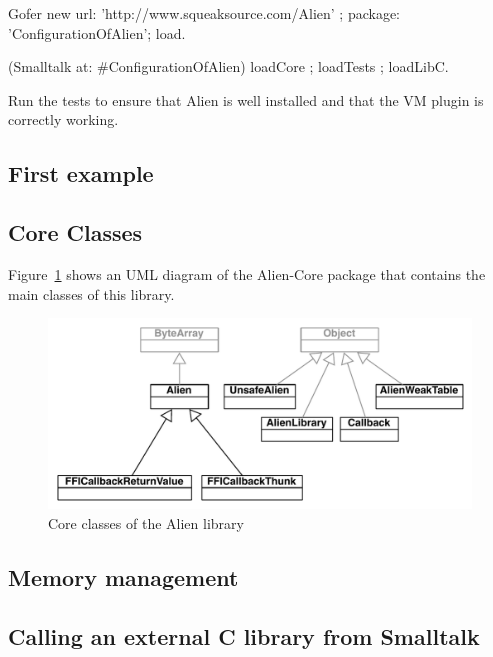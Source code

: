 \documentclass[a4paper,10pt,twoside]{book}
\begin{document}
\begin{code}{}
Gofer new
	url: 'http://www.squeaksource.com/Alien' ;
	package: 'ConfigurationOfAlien';
	load.

(Smalltalk at: #ConfigurationOfAlien) loadCore ; 
	loadTests ; 
	loadLibC.
\end{code}

Run the tests to ensure that Alien is well installed and that the VM plugin is correctly working.

\subsection{First example} \label{subsec:first_example} %




\subsection{Core Classes} 

Figure~\ref{fig:alien_uml} shows an UML diagram of the Alien-Core package that contains the main classes of this library.

\begin{figure}[htbp]
	\centering
		\includegraphics[width=0.9\linewidth]{figs/alien_uml}
	\caption{Core classes of the Alien library}
	\label{fig:alien_uml}
\end{figure}



\subsection{Memory management} \label{sec:memory_management} %


\subsection{Calling an external C library from Smalltalk} \label{sec:calling_an_external_c_library_from_smalltalk} %
\end{document}
